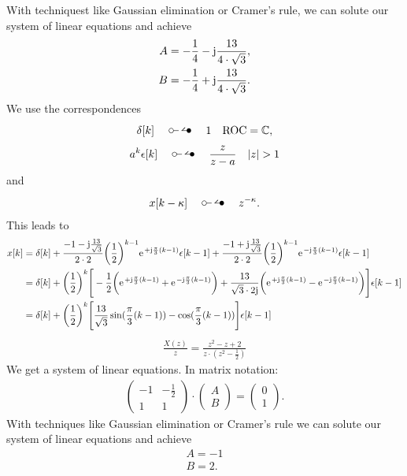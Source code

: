 With techniquest like Gaussian elimination or Cramer's rule, we can solute our system of linear equations and achieve
\begin{align}
	A=-\frac{1}{4}-\im\frac{13}{4\cdot\sqrt{3}}, \nonumber \\
	B=-\frac{1}{4}+\im\frac{13}{4\cdot\sqrt{3}}.
\end{align}
We use the correspondences
\begin{align}
	\delta[k]\quad\ztransf\quad1\quad\mathrm{ROC}=\mathbb{C},
\end{align}
\begin{align}
	a^k\epsilon[k]\quad\ztransf\quad\frac{z}{z-a}\quad|z|>1
\end{align}
and
\begin{align}
	x[k-\kappa]\quad\ztransf\quad z^{-\kappa}.
\end{align}
This leads to
\begin{align}
	x[k]&=\delta[k]+\frac{-1-\im\frac{13}{\sqrt{3}}}{2\cdot2}\bigg(\frac{1}{2}\bigg)^{k-1}\e^{+\im\frac{\pi}{3}(k-1)}\epsilon[k-1]+\frac{-1+\im\frac{13}{\sqrt{3}}}{2\cdot2}\bigg(\frac{1}{2}\bigg)^{k-1}\e^{-\im\frac{\pi}{3}(k-1)}\epsilon[k-1] \nonumber\\
	&=\delta[k]+\bigg(\frac{1}{2}\bigg)^{k}\Bigg[-\frac{1}{2}\bigg(\e^{+\im\frac{\pi}{3}(k-1)}+\e^{-\im\frac{\pi}{3}(k-1)}\bigg)+\frac{13}{\sqrt{3}\cdot2\im}\bigg(\e^{+\im\frac{\pi}{3}(k-1)}-\e^{-\im\frac{\pi}{3}(k-1)}\bigg)\Bigg ]\epsilon[k-1]\nonumber\\
	&=\delta[k]+\bigg(\frac{1}{2}\bigg)^k\Bigg[\frac{13}{\sqrt{3}}\sin(\frac{\pi}{3}(k-1))-\cos(\frac{\pi}{3}(k-1))\Bigg]\epsilon[k-1]
\end{align}
\begin{align}
	\frac{X(z)}{z}=\frac{z^2-z+2}{z\cdot(z^2-\frac{1}{2})}
\end{align}
We get a system of linear equations. In matrix notation:
\begin{align}
	\begin{pmatrix}
		-1 & -\frac{1}{2} \\
		1 & 1
	\end{pmatrix}
	\cdot
	\begin{pmatrix}
		A \\ B
	\end{pmatrix}
	=
	\begin{pmatrix}
		0 \\ 1
	\end{pmatrix}.
\end{align}
With techniques like Gaussian elimination or Cramer's rule we can solute our system of linear equations and achieve
\begin{align}
	A = -1 \nonumber \\
	B = 2.
\end{align}

